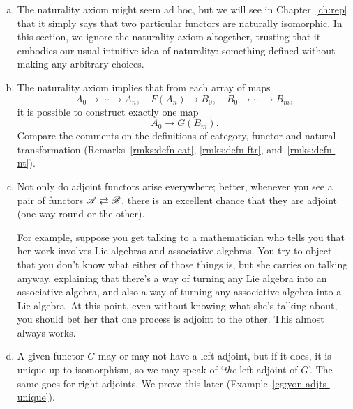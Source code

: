 \begin{remarks}
\label{rmks:adjts}
\begin{enumerate}[(b)]
\item
\label{rmk:adjts:nat}
The naturality axiom might seem ad hoc, but we will see in
Chapter~\ref{ch:rep} that it simply says that two particular functors are
naturally isomorphic.  In this section, we ignore the naturality axiom
altogether, trusting that it embodies our usual intuitive idea of
naturality: something defined without making any arbitrary choices.

\item
The naturality axiom implies that from each array of maps
\[
A_0 \to \cdots \to A_n,
\quad
F(A_n) \to B_0,
\quad
B_0 \to \cdots \to B_m,
\]
it is possible to construct exactly one%
%
%
map
\[
A_0 \to G(B_m).
\]
Compare the comments on the definitions of category, functor and natural
transformation (Remarks~\ref{rmks:defn-cat},
\ref{rmks:defn-ftr},
and~\ref{rmks:defn-nt}).

\item
\label{rmk:Lie-ass}
Not only do adjoint functors arise everywhere; better, whenever you see a
pair of functors $\mathscr{A}\rightleftarrows \mathscr{B}$, there is an excellent chance
that they are adjoint (one way round or the other).

For example, suppose you get talking to a mathematician who tells you that
her work involves Lie%
%
%
%
%
algebras and associative algebras.  You try to object
that you don't know what either of those things is, but she carries on
talking anyway, explaining that there's a way of turning any Lie algebra
into an associative algebra, and also a way of turning any associative
algebra into a Lie algebra.  At this point, even without knowing what she's
talking about, you should bet her that one process is adjoint to the other.
This almost always works.

\item
\label{rmks:adjts:uniqueness}
A given functor $G$ may or may not have a left adjoint, but if it does, it is
unique%
%
%
up to isomorphism, so we may speak of `\emph{the} left adjoint of $G$'.
The same goes for right adjoints.  We prove this later
(Example~\ref{eg:yon-adjts-unique}).


\end{enumerate}
\end{remarks}
